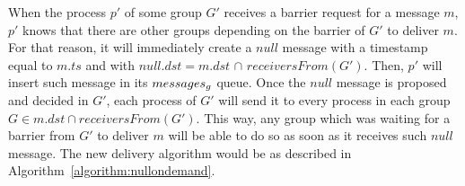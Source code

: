 \documentclass[times, 10pt]{article}
\begin{document}
When the process $p'$ of some group $G'$ receives a barrier request for a message $m$, %
$p'$ knows that there are other groups depending on the barrier of $G'$ to deliver $m$. For that reason, it will immediately create a $null$ message with a timestamp equal to $m.ts$ and with $null.dst = m.dst$ $\cap$ $receiversFrom(G')$. Then, $p'$ will insert such message in its %
$messages\text{$_g$}$ queue. %
Once the $null$ message is proposed and decided in $G'$, each process of $G'$ will send it to every process in each group \mbox{$G \in m.dst \cap receiversFrom(G')$}. This way, any group which was waiting for a barrier from $G'$ to deliver $m$ will be able to do so as soon as it receives such $null$ message. The new delivery algorithm would be as described in \mbox{Algorithm {\ref{algorithm:nullondemand}}}.
\end{document}
